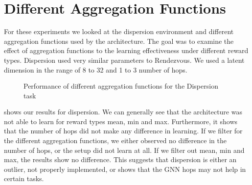 \section{Different Aggregation Functions}
\label{sec:Different Aggregation Functions}
For these experiments we looked at the dispersion environment and different aggregation functions used by the architecture. The goal was to examine the effect of aggregation functions to the learning effectiveness under different reward types. Dispersion used very similar parameters to Rendezvous. We used a latent dimension in the range of 8 to 32 and 1 to 3 number of hops.


\begin{figure}[htp]
    \centering
    \hspace{1cm}                       
    \caption{Performance of different aggregation functions for the Dispersion task}
    \label{fig:aggregation-compare}
\end{figure}

 shows our results for dispersion. We can generally see that the architecture was not able to learn for reward types mean, min and max. Furthermore, it shows that the number of hops did not make any difference in learning. If we filter for the different aggregation functions, we either observed no difference in the number of hops, or the setup did not learn at all. If we filter out mean, min and max, the results show no difference. This suggests that dispersion is either an outlier, not properly implemented, or shows that the GNN hops may not help in certain tasks. 


